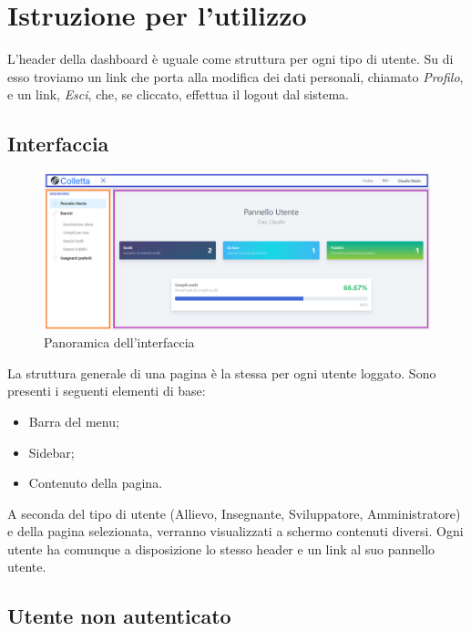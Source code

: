 \section{Istruzione per l'utilizzo}
  L'header della {dashboard} è uguale come struttura per ogni tipo di utente. Su di esso troviamo un link che porta alla modifica dei dati personali, chiamato \textit{Profilo}, e un link, \textit{Esci}, che, se cliccato, effettua il logout dal sistema.



\subsection{Interfaccia}
    \begin{figure}[H]
        \centering
   \includegraphics[width=17cm]{sez/img/istruzioni/panoramica.png} 
        \caption{Panoramica dell'interfaccia}\label{fig:1}
    \end{figure}
  La struttura generale di una pagina è la stessa per ogni utente loggato. Sono presenti i seguenti elementi di base:
    \begin{itemize}
        \item Barra del menu;
        \item {Sidebar};
        \item Contenuto della pagina.
    \end{itemize}
 A seconda del tipo di utente (Allievo, Insegnante, Sviluppatore, Amministratore) e della pagina selezionata, verranno visualizzati a schermo contenuti diversi. Ogni utente ha comunque a disposizione lo stesso header e un link al suo pannello utente.


\subsection{Utente non autenticato}
